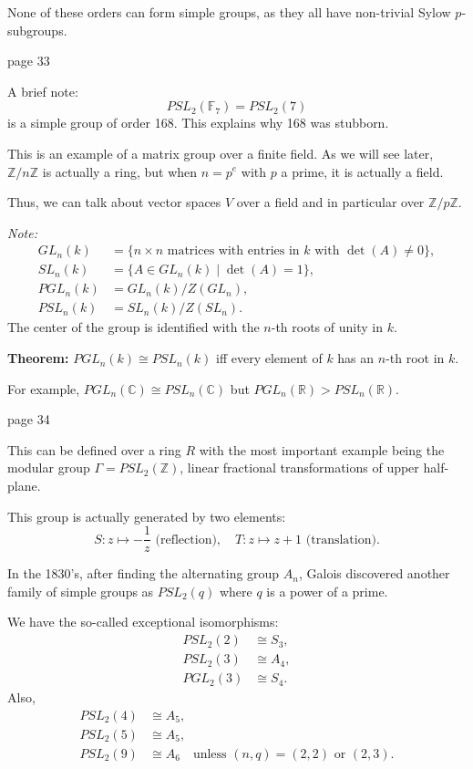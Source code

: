 \documentclass{article}
\begin{document}
None of these orders can form simple groups, as they all have non-trivial Sylow $p$-subgroups.

\newpage
\noindent page 33

A brief note:
\[
PSL_2(\mathbb{F}_7) = PSL_2(7)
\]
is a simple group of order 168. This explains why 168 was stubborn.

This is an example of a matrix group over a finite field. As we will see later, $\mathbb{Z}/n\mathbb{Z}$ is actually a ring, but when $n = p^e$ with $p$ a prime, it is actually a field.

Thus, we can talk about vector spaces $V$ over a field and in particular over $\mathbb{Z}/p\mathbb{Z}$.

\textit{Note:}
\[
\begin{aligned}
    GL_n(k) &= \{ n \times n \text{ matrices with entries in } k \text{ with } \det(A) \neq 0 \}, \\
    SL_n(k) &= \{ A \in GL_n(k) \mid \det(A) = 1 \}, \\
    PGL_n(k) &= GL_n(k) / Z(GL_n), \\
    PSL_n(k) &= SL_n(k) / Z(SL_n).
\end{aligned}
\]
The center of the group is identified with the $n$-th roots of unity in $k$.

\textbf{Theorem:} $PGL_n(k) \cong PSL_n(k)$ iff every element of $k$ has an $n$-th root in $k$.

For example, $PGL_n(\mathbb{C}) \cong PSL_n(\mathbb{C})$ but $PGL_n(\mathbb{R}) > PSL_n(\mathbb{R})$.

\newpage
\noindent page 34

This can be defined over a ring $R$ with the most important example being the modular group $\Gamma = PSL_2(\mathbb{Z})$, linear fractional transformations of upper half-plane.

This group is actually generated by two elements:
\[
S: z \mapsto -\frac{1}{z} \text{ (reflection)}, \quad T: z \mapsto z+1 \text{ (translation)}.
\]

In the 1830's, after finding the alternating group $A_n$, Galois discovered another family of simple groups as $PSL_2(q)$ where $q$ is a power of a prime.

We have the so-called exceptional isomorphisms:
\[
\begin{aligned}
    PSL_2(2) &\cong S_3, \\
    PSL_2(3) &\cong A_4, \\
    PGL_2(3) &\cong S_4.
\end{aligned}
\]
Also,
\[
\begin{aligned}
    PSL_2(4) &\cong A_5, \\
    PSL_2(5) &\cong A_5, \\
    PSL_2(9) &\cong A_6 \quad \text{unless } (n, q) = (2, 2) \text{ or } (2, 3).
\end{aligned}
\]
\end{document}
